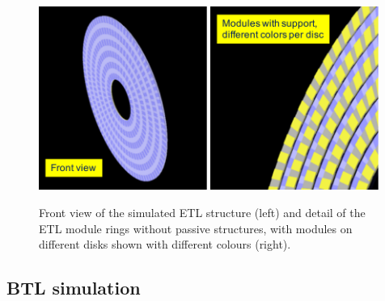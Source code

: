 \begin{figure}[hbtp]
\centering
\includegraphics[width=0.49\textwidth]{fig/performance/ETL1.pdf}
\includegraphics[width=0.49\textwidth]{fig/performance/ETL2.pdf}
\caption{Front view of the simulated ETL structure (left) and detail of the ETL module rings without passive structures, with modules on different disks shown with different colours (right).}
\label{fig:ETL1}
\end{figure}


\subsection{BTL simulation}
\label{sec:btlsim}

